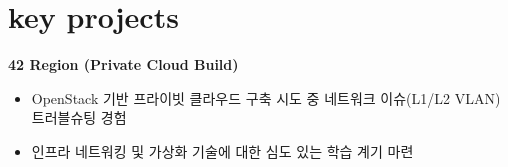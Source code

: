 \documentclass[10pt, a4paper]{article}
\begin{document}
\begin{minipage}[t]{0.62\textwidth}
    \vspace{1.0em}

    \section*{\huge{key projects}}
    \vspace{0.5em}
    \textbf{42 Region (Private Cloud Build)}
    \begin{itemize}[leftmargin=1em, label=\textbullet]
        \item OpenStack 기반 프라이빗 클라우드 구축 시도 중 네트워크 이슈(L1/L2 VLAN) 트러블슈팅 경험
        \item 인프라 네트워킹 및 가상화 기술에 대한 심도 있는 학습 계기 마련
    \end{itemize}

\end{minipage}
\end{document}
